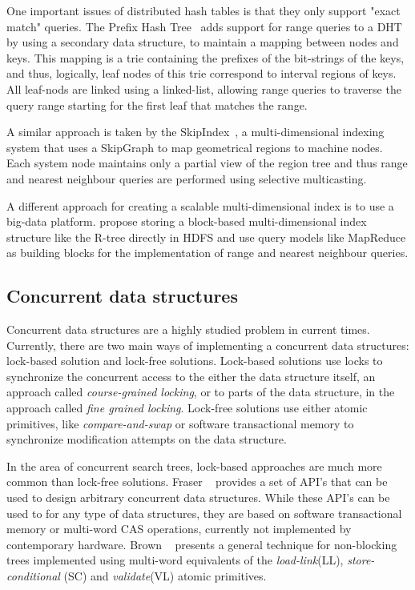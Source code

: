 \documentclass[11pt,a4paper]{globis-book}
\begin{document}
One important issues of distributed hash tables is that they only support "exact match" queries. The Prefix Hash Tree~\cite{Ramabhadran04prefixhash} adds support for range queries to a DHT by using a secondary data structure, to maintain a mapping between nodes and keys. This mapping is a trie containing the prefixes of the bit-strings of the keys, and thus, logically, leaf nodes of this trie correspond to interval regions of keys. All leaf-nods are linked using a linked-list, allowing range queries to traverse the query range starting for the first leaf that matches the range. 

A similar approach is taken by the SkipIndex~\cite{Zhang04skipindex}, a multi-dimensional indexing system that uses a SkipGraph to map geometrical regions to machine nodes. Each system node maintains only a partial view of the region tree and thus range and nearest neighbour queries are performed using selective multicasting.

A different approach for creating a scalable multi-dimensional index is to use a big-data platform. \cite{Liao2010HadoopIndex} propose storing a block-based multi-dimensional index structure like the R-tree directly in HDFS and use query models like MapReduce as building blocks for the implementation of range and nearest neighbour queries.

\subsection{Concurrent data structures}

Concurrent data structures are a highly studied problem in current times. Currently, there are two main ways of implementing a concurrent data structures: lock-based solution and lock-free solutions. Lock-based solutions use locks to synchronize the concurrent access to the either the data structure itself, an approach called \textit{course-grained locking}, or to parts of the data structure, in the approach called \textit{fine grained locking}. Lock-free solutions use either atomic primitives, like \textit{compare-and-swap} or software transactional memory to synchronize modification attempts on the data structure.

In the area of concurrent search trees, lock-based approaches are much more common than lock-free solutions. Fraser ~\cite{Fraser2007concurrent} provides a set of API's that can be used to design arbitrary concurrent data structures. While these API's can be used to for any type of data structures, they are based on software transactional memory or multi-word CAS operations, currently not implemented by contemporary hardware. Brown ~\cite{Brown2014concurrent} presents a general technique for non-blocking trees implemented using multi-word equivalents of the \textit{load-link}(LL), \textit{store-conditional} (SC) and \textit{validate}(VL) atomic primitives.
\end{document}
